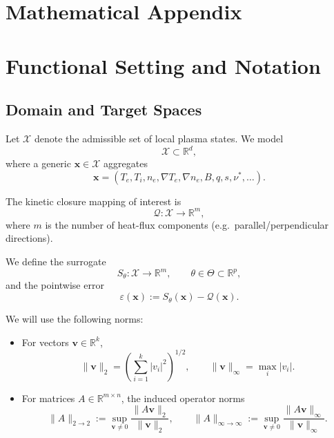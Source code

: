 \documentclass[11pt]{article}
\begin{document}
\appendix

\section*{Mathematical Appendix}

\section{Functional Setting and Notation}

\subsection{Domain and Target Spaces}

Let $\mathcal{X}$ denote the admissible set of local plasma states. We model
\begin{equation}
  \mathcal{X} \subset \mathbb{R}^d,
\end{equation}
where a generic $\bm{x} \in \mathcal{X}$ aggregates
\[
  \bm{x} = (T_e, T_i, n_e, \nabla T_e, \nabla n_e, B, q, s, \nu^\ast, \ldots).
\]

The kinetic closure mapping of interest is
\begin{equation}
  \mathcal{Q}: \mathcal{X} \to \mathbb{R}^m,
\end{equation}
where $m$ is the number of heat-flux components (e.g.\ parallel/perpendicular directions).

We define the surrogate
\begin{equation}
  S_\theta: \mathcal{X} \to \mathbb{R}^m, \qquad \theta \in \Theta \subset \mathbb{R}^p,
\end{equation}
and the pointwise error
\begin{equation}
  \varepsilon(\bm{x}) := S_\theta(\bm{x}) - \mathcal{Q}(\bm{x}).
\end{equation}

We will use the following norms:

\begin{itemize}
  \item For vectors $\bm{v} \in \mathbb{R}^k$,
  \[
    \|\bm{v}\|_2 = \left( \sum_{i=1}^k |v_i|^2 \right)^{1/2}, \qquad 
    \|\bm{v}\|_\infty = \max_i |v_i|.
  \]
  \item For matrices $A \in \mathbb{R}^{m \times n}$, the induced operator norms
  \[
    \|A\|_{2\to 2} := \sup_{\bm{v} \neq 0} \frac{\|A\bm{v}\|_2}{\|\bm{v}\|_2}, \qquad 
    \|A\|_{\infty\to\infty} := \sup_{\bm{v} \neq 0} \frac{\|A\bm{v}\|_\infty}{\|\bm{v}\|_\infty}.
  \]
\end{itemize}
\end{document}
